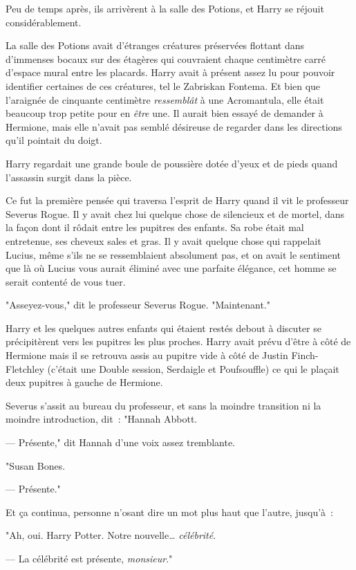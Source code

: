 Peu de temps après, ils arrivèrent à la salle des Potions, et Harry se réjouit considérablement.

La salle des Potions avait d'étranges créatures préservées flottant dans d'immenses bocaux sur des étagères qui couvraient chaque centimètre carré d'espace mural entre les placards. Harry avait à présent assez lu pour pouvoir identifier certaines de ces créatures, tel le Zabriskan Fontema. Et bien que l'araignée de cinquante centimètre \emph{ressemblât} à une Acromantula, elle était beaucoup trop petite pour en \emph{être} une. Il aurait bien essayé de demander à Hermione, mais elle n'avait pas semblé désireuse de regarder dans les directions qu'il pointait du doigt.

Harry regardait une grande boule de poussière dotée d'yeux et de pieds quand l'assassin surgit dans la pièce.

Ce fut la première pensée qui traversa l'esprit de Harry quand il vit le professeur Severus Rogue. Il y avait chez lui quelque chose de silencieux et de mortel, dans la façon dont il rôdait entre les pupitres des enfants. Sa robe était mal entretenue, ses cheveux sales et gras. Il y avait quelque chose qui rappelait Lucius, même s'ils ne se ressemblaient absolument pas, et on avait le sentiment que là où Lucius vous aurait éliminé avec une parfaite élégance, cet homme se serait contenté de vous tuer.

"Asseyez-vous," dit le professeur Severus Rogue. "Maintenant."

Harry et les quelques autres enfants qui étaient restés debout à discuter se précipitèrent vers les pupitres les plus proches. Harry avait prévu d'être à côté de Hermione mais il se retrouva assis au pupitre vide à côté de Justin Finch-Fletchley (c'était une Double session, Serdaigle et Poufsouffle) ce qui le plaçait deux pupitres à gauche de Hermione.

Severus s'assit au bureau du professeur, et sans la moindre transition ni la moindre introduction, dit~: "Hannah Abbott.

--- Présente," dit Hannah d'une voix assez tremblante.

"Susan Bones.

--- Présente."

Et ça continua, personne n'osant dire un mot plus haut que l'autre, jusqu'à~:

"Ah, oui. Harry Potter. Notre nouvelle… \emph{célébrité}.

--- La célébrité est présente, \emph{monsieur}."

